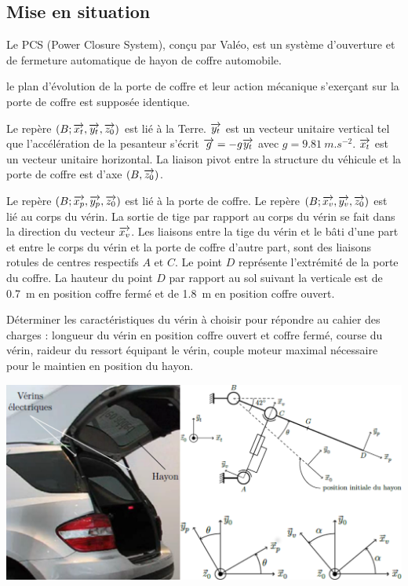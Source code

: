 \documentclass[10pt,fleqn]{article} %
\begin{document}

\vspace{4.5cm}
\pagestyle{fancy}
\thispagestyle{plain}


\def\columnseprulecolor{\color{ocre}}
\setlength{\columnseprule}{0.4pt} 

\ifprof
\begin{multicols}{2}
\else
\begin{multicols}{2}
\fi
\section*{Mise en situation}
Le PCS (Power Closure System), conçu par Valéo, est un système d’ouverture et de fermeture automatique de
hayon de coffre automobile.

le plan d’évolution de la porte de coffre et leur action mécanique s’exerçant sur la porte de coffre est supposée identique.

Le repère $\left(B;\overrightarrow{x_t},\overrightarrow{y_t},\overrightarrow{z_0} \right)$ est lié à la Terre. $\overrightarrow{y_t}$ est un vecteur unitaire vertical tel que l’accélération de la pesanteur s’écrit $\overrightarrow{g}=-g\overrightarrow{y_t}$ avec $g=\SI{9,81}{m.s^{-2}}$. $\overrightarrow{x_t}$ est un vecteur unitaire horizontal. La liaison pivot entre
la structure du véhicule et la porte de coffre est d’axe $\left(B,\overrightarrow{z_0}\right)$.

Le repère $\left(B;\overrightarrow{x_p},\overrightarrow{y_p},\overrightarrow{z_0} \right)$ est lié à la porte de coffre. Le repère $\left(B;\overrightarrow{x_v},\overrightarrow{y_v},\overrightarrow{z_0} \right)$ est lié au corps du vérin. La sortie
de tige par rapport au corps du vérin se fait dans la direction du vecteur $\overrightarrow{x_v}$.
Les liaisons entre la tige du vérin et le bâti d’une part et entre le corps du vérin et la porte de coffre d’autre part, sont des liaisons rotules de centres respectifs $A$ et $C$.
Le point $D$ représente l’extrémité de la porte du coffre. La hauteur du point $D$ par rapport au sol suivant la
verticale est de \SI{0,7}{m} en position coffre fermé et de \SI{1,8}{m} en position coffre ouvert.

\begin{obj}
Déterminer les caractéristiques du vérin à choisir pour répondre au cahier des charges : longueur
du vérin en position coffre ouvert et coffre fermé, course du vérin, raideur du ressort équipant le
vérin, couple moteur maximal nécessaire pour le maintien en position du hayon.
\end{obj}

\begin{center}
\includegraphics[width=\linewidth]{images/fig_01}
\end{center}


\end{multicols}
\end{multicols}
\end{document}
